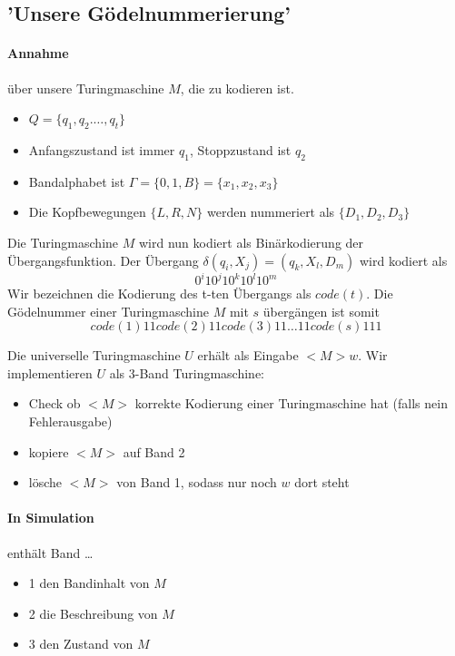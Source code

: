 \subsection{'Unsere Gödelnummerierung'}

\paragraph*{Annahme} über unsere Turingmaschine $M$, die zu kodieren ist.
\begin{itemize}
	\item $Q=\{q_1,q_2.\dots,q_t\}$
	\item Anfangszustand ist immer $q_1$, Stoppzustand ist $q_2$
	\item Bandalphabet ist $\Gamma=\{0,1,B\}=\{x_1,x_2,x_3\}$
	\item Die Kopfbewegungen $\{L,R,N\}$ werden nummeriert als $\{D_1,D_2,D_3\}$
\end{itemize}
Die Turingmaschine $M$ wird nun kodiert als Binärkodierung der Übergangsfunktion. Der Übergang $\delta(q_i,X_j)=(q_k,X_l,D_m)$ wird kodiert als $$0^i10^j10^k10^l10^m$$ Wir bezeichnen die Kodierung des t-ten Übergangs als $code(t)$. Die Gödelnummer einer Turingmaschine $M$ mit $s$ übergängen ist somit $$code(1)11code(2)11code(3)11 \dots 11code(s)111$$ %

\par\medskip
Die universelle Turingmaschine $U$ erhält als Eingabe $<M>w$. Wir implementieren $U$ als 3-Band Turingmaschine:
\begin{itemize}
	\item Check ob $<M>$ korrekte Kodierung einer Turingmaschine hat (falls nein Fehlerausgabe)
	\item kopiere $<M>$ auf Band 2
	\item lösche $<M>$ von Band 1, sodass nur noch $w$ dort steht
\end{itemize}
\par\medskip

\paragraph*{In Simulation} enthält Band \dots
\begin{itemize}
	\item 1 den Bandinhalt von $M$
	\item 2 die Beschreibung von $M$
	\item 3 den Zustand von $M$
\end{itemize}

